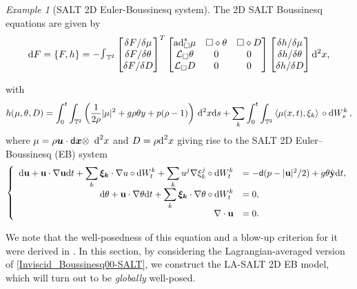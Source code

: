 \documentclass[11pt, oneside]{article}   	%
\numberwithin{equation}{section}
\theoremstyle{plain}
\theoremstyle{definition}
\theoremstyle{remark}
\newtheorem{example}{Example}
\newcommand{\<}{\langle}
\renewcommand{\>}{\rangle}
\def\diff{\textnormal{d}}
\def\u{{\bf{u}}}
\def\y{{\bf{y}}}
\def\rmd{{\mathrm{d}}}
\newcommand{\mb}[1]{\mbox{\boldmath{$#1$}}}
\begin{document}
\begin{example}[SALT 2D Euler-Boussinesq system]
The 2D SALT Boussinesq equations are given by
\begin{align}\label{Ham-matrix-Boussinesq-SALT}
\diff  {F} =\{ F, h\}
=
-\hbox{\Large$\int$}_{\mathbb{T}^2}
\begin{bmatrix}
{\delta F}/{\delta \mu} \\  {\delta F}/{ \delta \theta}  \\  {\delta F}/{ \delta D}
\end{bmatrix}^T
\begin{bmatrix}
{\rm ad}^*_{\Box} \mu & \Box \diamond \theta & \Box \diamond D
\\ 
\mathcal{L}_{\Box} \theta & 0 & 0 \\
\mathcal{L}_{\Box} D & 0 & 0
\end{bmatrix}
\begin{bmatrix}
{\delta h } / {\delta \mu}
\\  {\delta h}/{ \delta \theta} \\
 {\delta h}/{ \delta D} 
\end{bmatrix}
{\rmd} ^2x,
\end{align}
\end{example}
with
\begin{align}\label{Boussinesq-Ham-SALT}
h(\mu,\theta,D) = \int_{0}^t \int_{\mathbb{T}^2} \left(\frac{1}{2\rho} |\mu|^2  +  g \rho \theta y + p (\rho-1) \right) \,{\rmd} ^2x \diff s +  \displaystyle\sum_k\int_{0}^t \int_{\mathbb{T}^2} \left \langle \mu (x,t), \xi_k \right \rangle \, \circ \diff W_s^k
\,,
\end{align}
where $\mu = \rho \mb{u}  \cdot \sf{d} \mb{x} \otimes$ $\diff^2 x$ and $D = \rho \diff^2 x$ giving rise to the SALT 2D Euler--Boussinesq (EB) system
\begin{equation}\label{Inviscid_Boussinesq00-SALT}
\left\{
\begin{array}{rl}   
\diff \u + \u \cdot \nabla \u \diff t + \displaystyle\sum_k \mb{\xi_k} \cdot \nabla u \circ \diff W_t^k + \displaystyle\sum_k u^j \nabla \xi_k^j \circ \diff W_t^k 
&= -{\sf{d}}(p- |\u|^2/2)  + g\theta \hat{\y} \diff t,\\
\diff \theta + \u \cdot \nabla \theta \diff t + \displaystyle\sum_k \mb{\xi_k} \cdot \nabla \theta \circ \diff W_t^k &= 0, \\
\nabla\cdot\u&=0.
\end{array}
\right.
\end{equation}

We note that the well-posedness of this equation and a blow-up criterion for it were derived in \cite{DieAytJNLS}. In this section, by considering the Lagrangian-averaged version of \eqref{Inviscid_Boussinesq00-SALT}, we construct the LA-SALT 2D EB model, which will turn out to be \emph{globally} well-posed.
\end{document}
